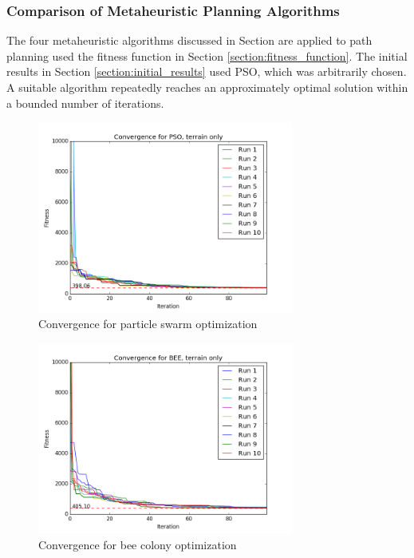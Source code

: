 \documentclass{tamuccthesis}
\begin{document}
\subsubsection{Comparison of Metaheuristic Planning Algorithms}

The four metaheuristic algorithms discussed in Section \label{section:goto} are applied to path planning used the fitness function in Section \ref{section:fitness_function}. The initial results in Section \ref{section:initial_results} used PSO, which was arbitrarily chosen. A suitable algorithm repeatedly reaches an approximately optimal solution within a bounded number of iterations. 


\begin{figure}
    \captionsetup{justification=centering}
    \centering
        \includegraphics[width=0.75\textwidth]{conv_PSO_a.png}
    \caption[]{{\small Convergence for particle swarm optimization}}
    \label{fig:convergence_a_PSO}
\end{figure}

\begin{figure}
    \captionsetup{justification=centering}
    \centering
        \includegraphics[width=0.75\textwidth]{conv_BEE_a.png}
    \caption[]{{\small Convergence for bee colony optimization }}
    \label{fig:convergence_a_BEE}
\end{figure}
\end{document}

